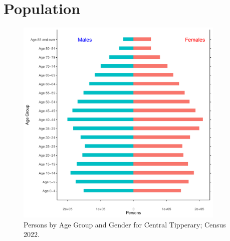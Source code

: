 \documentclass{article}
\begin{document}
\pagebreak

\section{Population} 
\label{sect:Pop}

\begin{figure}[h]
	\centering
	\includegraphics[width = 100mm]{../figures/PyramidPlot.pdf}
	\caption{Persons by Age Group and Gender for Central Tipperary; Census 2022.}
	\label{fig:2ae19629-1a6a-13a3-e055-000000000001}
	\end{figure}
\end{document}
